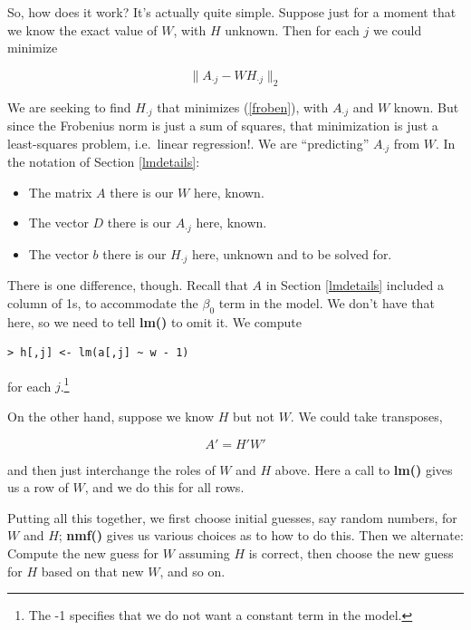 So, how does it work?  It's actually quite simple.  Suppose just for a
moment that we know the exact value of $W$, with $H$ unknown.  Then for
each $j$ we could minimize

\begin{equation}
\label{errajwhj}
\|A_{\cdot j} - W H_{\cdot j}\|_2
\end{equation}

We are seeking to find $H_{\cdot j}$ that minimizes (\ref{froben}), with
$A_{\cdot j}$ and $W$ known.  But since the Frobenius norm is just a sum
of squares, that minimization is just a least-squares problem, i.e.\
linear regression!.  We are ``predicting'' $A_{\cdot j}$ from $W$.  
In the notation of Section \ref{lmdetails}:

\begin{itemize}

\item The matrix $A$ there is our $W$ here, known.

\item The vector $D$ there is our $A_{\cdot j}$ here, known.

\item The vector $b$ there is our $H_{\cdot j}$ here, unknown and to be
solved for.

\end{itemize} 

There is one difference, though.  Recall that $A$ in Section
\ref{lmdetails} included a column of 1s, to accommodate the $\beta_0$
term in the model.  We don't have that here, so we need to tell
\textbf{lm()} to omit it.  We compute 

\begin{lstlisting}
> h[,j] <- lm(a[,j] ~ w - 1)
\end{lstlisting}

for each $j$.\footnote{The -1 specifies that we do not want a constant term in
the model.}

On the other hand, suppose we know $H$ but not $W$.  We could take 
transposes,

\begin{equation}
A' = H' W'
\end{equation}

and then just interchange the roles of $W$ and $H$ above.  Here a call
to {\bf lm()} gives us a row of $W$, and we do this for all rows.

Putting all this together, we first choose initial guesses, say random
numbers, for $W$ and $H$; {\bf nmf()} gives us various choices as to how
to do this.  Then we alternate: Compute the new guess for $W$ assuming
$H$ is correct, then choose the new guess for $H$ based on that new $W$,
and so on.

